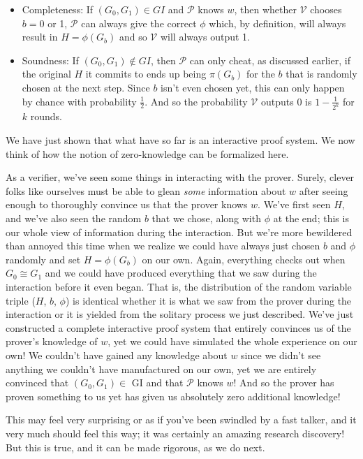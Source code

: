 		\begin{itemize}
			\item Completeness: If $(G_0,G_1)\in GI$ and $\mathcal{P}$ knows $w$, then whether $\mathcal{V}$ chooses $b=0$ or 1, $\mathcal{P}$ can always give the correct $\phi$ which, by definition, will always result in $H=\phi(G_b)$ and so $\mathcal{V}$ will always output 1.
			\item Soundness: If $(G_0,G_1)\notin GI$, then $\mathcal{P}$ can only cheat, as discussed earlier, if the original $H$ it commits to ends up being $\pi(G_b)$ for the $b$ that is randomly chosen at the next step.  Since $b$ isn't even chosen yet, this can only happen by chance with probability $\frac{1}{2}$.  And so the probability $\mathcal{V}$ outputs 0 is $1-\frac{1}{2^k}$ for $k$ rounds.
		\end{itemize}
		
		We have just shown that what have so far is an interactive proof system. We now think of how the notion of zero-knowledge can be formalized here.
		
		As a verifier, we've seen some things in interacting with the prover.  Surely, clever folks like ourselves must be able to glean \textit{some} information about $w$ after seeing enough to thoroughly convince us that the prover knows $w$.  We've first seen $H$, and we've also seen the random $b$ that we chose, along with $\phi$ at the end;  this is our whole view of information during the interaction.  But we're more bewildered than annoyed this time when we realize we could have always just chosen $b$ and $\phi$ randomly and set $H=\phi(G_b)$ on our own.  Again, everything checks out when $G_0 \cong G_1$ and we could have produced everything that we saw during the interaction before it even began.  That is, the distribution of the random variable triple ($H$, $b$, $\phi$) is identical whether it is what we saw from the prover during the interaction or it is yielded from the solitary process we just described.  We've just constructed a complete interactive proof system that entirely convinces us of the prover's knowledge of $w$, yet we could have simulated the whole experience on our own!  We couldn't have gained any knowledge about $w$ since we didn't see anything we couldn't have manufactured on our own, yet we are entirely convinced that $(G_0,G_1)\in$ GI and that $\mathcal{P}$ knows $w$!  And so the prover has proven something to us yet has given us absolutely zero additional knowledge!
		
		This may feel very surprising or as if you've been swindled by a fast talker, and it very much should feel this way; it was certainly an amazing research discovery!  But this is true, and it can be made rigorous, as we do next.
		
